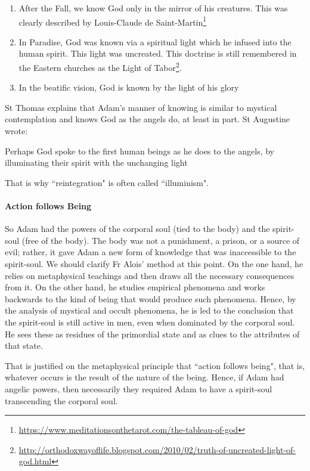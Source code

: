 \begin{enumerate}
\item After the Fall, we know God only in the mirror of his creatures. This was clearly described by Louis-Claude de Saint-Martin\footnote{\url{https://www.meditationsonthetarot.com/the-tableau-of-god}}
\item In Paradise, God was known via a spiritual light which he infused into the human spirit. This light was uncreated. This doctrine is still remembered in the Eastern churches as the Light of Tabor\footnote{\url{http://orthodoxwayoflife.blogspot.com/2010/02/truth-of-uncreated-light-of-god.html}}. 
\item In the beatific vision, God is known by the light of his glory 
\end{enumerate}
St Thomas explains that Adam's manner of knowing is similar to mystical contemplation and knows God as the angels do, at least in part. St Augustine wrote:

\begin{quotex}
Perhaps God spoke to the first human beings as he does to the angels, by illuminating their spirit with the unchanging light 

\end{quotex}
That is why ``reintegration" is often called ``illuminism".

\paragraph{Action follows Being}
So Adam had the powers of the corporal soul (tied to the body) and the spirit-soul (free of the body). The body was not a punishment, a prison, or a source of evil; rather, it gave Adam a new form of knowledge that was inaccessible to the spirit-soul. We should clarify Fr Alois' method at this point. On the one hand, he relies on metaphysical teachings and then draws all the necessary consequences from it. On the other hand, he studies empirical phenomena and works backwards to the kind of being that would produce such phenomena. Hence, by the analysis of mystical and occult phenomena, he is led to the conclusion that the spirit-soul is still active in men, even when dominated by the corporal soul. He sees these as residues of the primordial state and as clues to the attributes of that state.

That is justified on the metaphysical principle that ``action follows being", that is, whatever occurs is the result of the nature of the being. Hence, if Adam had angelic powers, then necessarily they required Adam to have a spirit-soul transcending the corporal soul.

